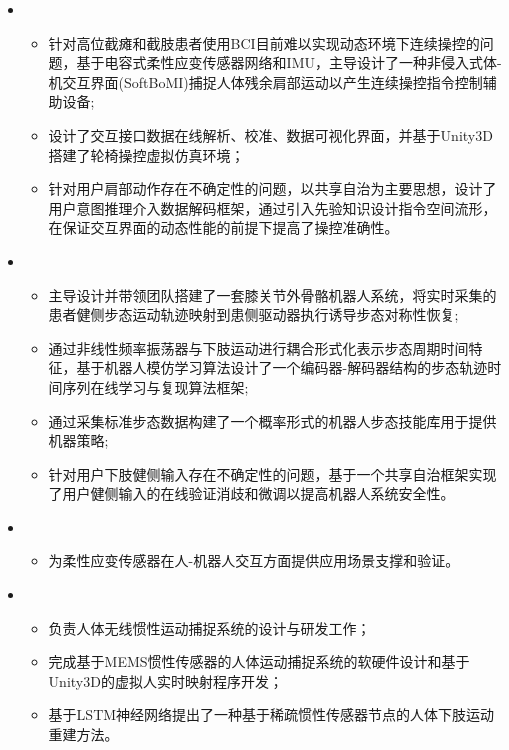  \begin{itemize}[leftmargin=*]
    \item {}
    {\small
      \begin{itemize}
        \item 针对高位截瘫和截肢患者使用BCI目前难以实现动态环境下连续操控的问题，基于电容式柔性应变传感器网络和IMU，主导设计了一种非侵入式体-机交互界面(SoftBoMI)捕捉人体残余肩部运动以产生连续操控指令控制辅助设备;
        \item 设计了交互接口数据在线解析、校准、数据可视化界面，并基于Unity3D搭建了轮椅操控虚拟仿真环境；
        \item 针对用户肩部动作存在不确定性的问题，以共享自治为主要思想，设计了用户意图推理介入数据解码框架，通过引入先验知识设计指令空间流形，在保证交互界面的动态性能的前提下提高了操控准确性。
      \end{itemize}
    }

    \item {}
    {\small
    \begin{itemize}
      \item 主导设计并带领团队搭建了一套膝关节外骨骼机器人系统，将实时采集的患者健侧步态运动轨迹映射到患侧驱动器执行诱导步态对称性恢复;
      \item 通过非线性频率振荡器与下肢运动进行耦合形式化表示步态周期时间特征，基于机器人模仿学习算法设计了一个编码器-解码器结构的步态轨迹时间序列在线学习与复现算法框架;
      \item 通过采集标准步态数据构建了一个概率形式的机器人步态技能库用于提供机器策略;
      \item 针对用户下肢健侧输入存在不确定性的问题，基于一个共享自治框架实现了用户健侧输入的在线验证消歧和微调以提高机器人系统安全性。
    \end{itemize}
    }

    \item {}
    {\small
    \begin{itemize}
      \item 为柔性应变传感器在人-机器人交互方面提供应用场景支撑和验证。
    \end{itemize}
    }

    \item {}
    {\small
    \begin{itemize}
      \item 负责人体无线惯性运动捕捉系统的设计与研发工作；
      \item 完成基于MEMS惯性传感器的人体运动捕捉系统的软硬件设计和基于Unity3D的虚拟人实时映射程序开发；
      \item 基于LSTM神经网络提出了一种基于稀疏惯性传感器节点的人体下肢运动重建方法。
    \end{itemize}
    }


\end{itemize}

